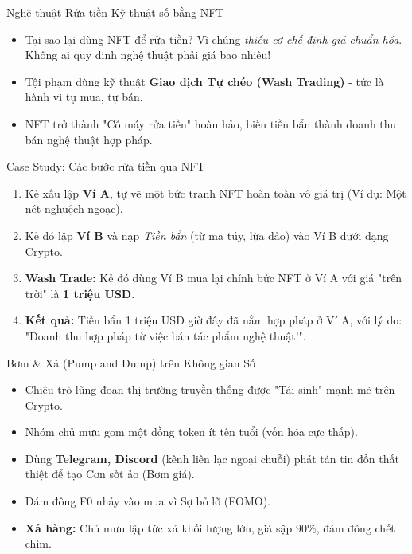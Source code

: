\documentclass[aspectratio=169, 12pt]{beamer}
\begin{document}
\begin{frame}{Nghệ thuật Rửa tiền Kỹ thuật số bằng NFT}
    \begin{itemize}
        \item Tại sao lại dùng NFT để rửa tiền? Vì chúng \textit{thiếu cơ chế định giá chuẩn hóa}. Không ai quy định nghệ thuật phải giá bao nhiêu!
        \item Tội phạm dùng kỹ thuật \textbf{Giao dịch Tự chéo (Wash Trading)} - tức là hành vi tự mua, tự bán.
        \item NFT trở thành "Cỗ máy rửa tiền" hoàn hảo, biến tiền bẩn thành doanh thu bán nghệ thuật hợp pháp.
    \end{itemize}
\end{frame}

\begin{frame}{Case Study: Các bước rửa tiền qua NFT}
    \begin{enumerate}
        \item Kẻ xấu lập \textbf{Ví A}, tự vẽ một bức tranh NFT hoàn toàn vô giá trị (Ví dụ: Một nét nghuệch ngoạc).
        \item Kẻ đó lập \textbf{Ví B} và nạp \textit{Tiền bẩn} (từ ma túy, lừa đảo) vào Ví B dưới dạng Crypto.
        \item \textbf{Wash Trade:} Kẻ đó dùng Ví B mua lại chính bức NFT ở Ví A với giá "trên trời" là \textbf{1 triệu USD}.
        \item \textbf{Kết quả:} Tiền bẩn 1 triệu USD giờ đây đã nằm hợp pháp ở Ví A, với lý do: "Doanh thu hợp pháp từ việc bán tác phẩm nghệ thuật!".
    \end{enumerate}
\end{frame}

\begin{frame}{Bơm \& Xả (Pump and Dump) trên Không gian Số}
    \begin{itemize}
        \item Chiêu trò lũng đoạn thị trường truyền thống được "Tái sinh" mạnh mẽ trên Crypto.
        \item Nhóm chủ mưu gom một đồng token ít tên tuổi (vốn hóa cực thấp).
        \item Dùng \textbf{Telegram, Discord} (kênh liên lạc ngoại chuỗi) phát tán tin đồn thất thiệt để tạo Cơn sốt ảo (Bơm giá).
        \item Đám đông F0 nhảy vào mua vì Sợ bỏ lỡ (FOMO).
        \item \textbf{Xả hàng:} Chủ mưu lập tức xả khối lượng lớn, giá sập 90\%, đám đông chết chìm.
    \end{itemize}
\end{frame}
\end{document}
